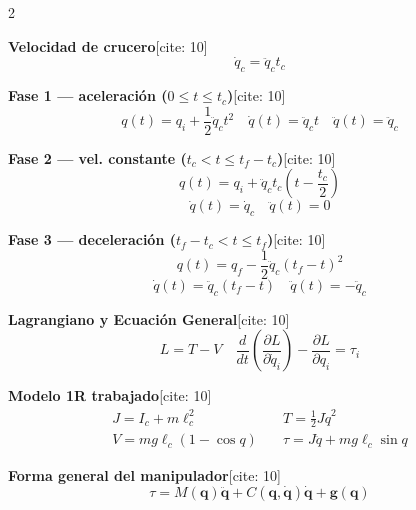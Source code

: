 \documentclass[10pt, a4paper]{article}
\begin{document}
\begin{multicols*}{2}
\begin{tcolorbox}[sectionbox, title=4. Trayectoria LSPB{[cite: 10]}]
\textbf{Velocidad de crucero}[cite: 10]
\begin{equation*}
    \boxed{ \dot{q}_c=\ddot{q}_c t_c }
\end{equation*}

\textbf{Fase 1 — aceleración ($0\le t\le t_c$)}[cite: 10]
\begin{equation*}
    \boxed{ q(t)=q_i+\frac{1}{2}\ddot{q}_c t^2 } \quad \boxed{ \dot{q}(t)=\ddot{q}_c t } \quad \boxed{ \ddot{q}(t)=\ddot{q}_c }
\end{equation*}

\textbf{Fase 2 — vel. constante ($t_c<t\le t_f-t_c$)}[cite: 10]
\begin{equation*}
    \boxed{ q(t) = q_i+ \ddot{q}_c t_c \left( t-\frac{t_c}{2} \right) }
\end{equation*}
\begin{equation*}
    \boxed{ \dot{q}(t)=\dot{q}_c } \quad \boxed{ \ddot{q}(t)=0 }
\end{equation*}

\textbf{Fase 3 — deceleración ($t_f-t_c<t\le t_f$)}[cite: 10]
\begin{equation*}
    \boxed{ q(t) = q_f - \frac{1}{2}\ddot{q}_c(t_f-t)^2 }
\end{equation*}
\begin{equation*}
    \boxed{ \dot{q}(t) = \ddot{q}_c(t_f-t) } \quad \boxed{ \ddot{q}(t) = -\ddot{q}_c }
\end{equation*}
\end{tcolorbox}

\begin{tcolorbox}[sectionbox, title=5. Dinámica — Euler–Lagrange{[cite: 10]}]
\textbf{Lagrangiano y Ecuación General}[cite: 10]
\begin{equation*}
    \boxed{ L=T-V } \quad \boxed{ \frac{d}{dt} \left( \frac{\partial L}{\partial\dot{q}_i} \right) - \frac{\partial L}{\partial q_i} = \tau_i }
\end{equation*}

\textbf{Modelo 1R trabajado}[cite: 10]
\begin{align*}
    \boxed{ J=I_c+m\ell_c^2 } \quad &\boxed{ T= \frac{1}{2}J\dot{q}^2 } \\
    \boxed{ V= mg\ell_c(1-\cos q) } \quad &\boxed{ \tau = J\ddot{q} + mg\ell_c\sin q }
\end{align*}

\textbf{Forma general del manipulador}[cite: 10]
\begin{equation*}
    \boxed{ \tau = M(\mathbf{q})\ddot{\mathbf{q}} + C(\mathbf{q},\dot{\mathbf{q}})\dot{\mathbf{q}} + \mathbf{g}(\mathbf{q}) }
\end{equation*}
\end{tcolorbox}


\end{multicols*}
\end{document}
